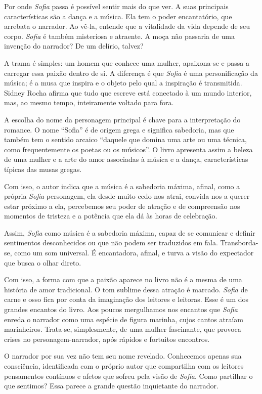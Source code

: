 \documentclass[12pt]{extarticle}
\begin{document}
Por onde \textit{Sofia} passa é possível sentir mais do que ver. 
A suas principais características são a dança e a música. 
Ela tem o poder encantatório, que arrebata o narrador. Ao vê-la,
entende que a vitalidade da vida depende de seu corpo. 
\textit{Sofia} é também misteriosa e atraente. A moça 
não passaria de uma invenção do narrador? De um delírio, talvez?  

A trama é simples: um homem que conhece uma mulher, apaixona-se e passa a
carregar essa paixão dentro de si. A diferença é que \textit{Sofia} é uma personificação
da música; é a musa que inspira e o objeto pelo qual a inspiração é
transmitida. Sidney Rocha afirma que tudo que escreve está conectado à um mundo interior, mas, ao mesmo tempo, inteiramente 
voltado para fora.

A escolha do nome da personagem principal é chave para a interpretação 
do romance. O nome ``Sofia'' é de origem grega e significa sabedoria, 
mas que também tem o sentido arcaico ``daquele que domina uma arte 
ou uma técnica, como frequentemente os poetas ou os músicos''. 
O livro apresenta assim a beleza de uma mulher e a arte do amor
associadas à música e a dança, características típicas das 
musas gregas.

Com isso, o autor indica que
a música é a sabedoria máxima, afinal, como a própria \textit{Sofia} personagem, ela
desde muito cedo nos atrai, convida-nos a querer estar próximo a ela,
percebemos seu poder de atração e de compreensão nos momentos de tristeza e a
potência que ela dá às horas de celebração.  

Assim, \textit{Sofia} como música é a
sabedoria máxima, capaz de se comunicar e definir sentimentos
desconhecidos ou que não podem ser traduzidos em fala. Transborda-se, como 
um som universal. É encantadora, afinal, e turva a visão do expectador que 
busca o olhar direto.  

Com isso, a forma com que a paixão aparece no livro não é a mesma
de uma história de amor tradicional. O tom sublime dessa atração é 
marcado.  \textit{Sofia} de carne e osso fica por conta da imaginação
dos leitores e leitoras. Esse é um dos grandes encantos do livro. Aos poucos
mergulhamos nos encantos que \textit{Sofia} enreda o narrador como uma espécie 
de figura marinha, cujos cantos atraíam marinheiros.
Trata-se, simplesmente, de uma mulher fascinante, que provoca crises no
personagem-narrador, após rápidos e fortuitos encontros.  

O narrador por sua vez não tem seu nome revelado. Conhecemos apenas sua
consciência, identificada com o próprio autor
que compartilha com os leitores pensamentos contínuos e afetos que sofreu
pela visão de \textit{Sofia}. Como partilhar o que sentimos? 
Essa parece a grande questão inquietante do narrador.  
\end{document}
